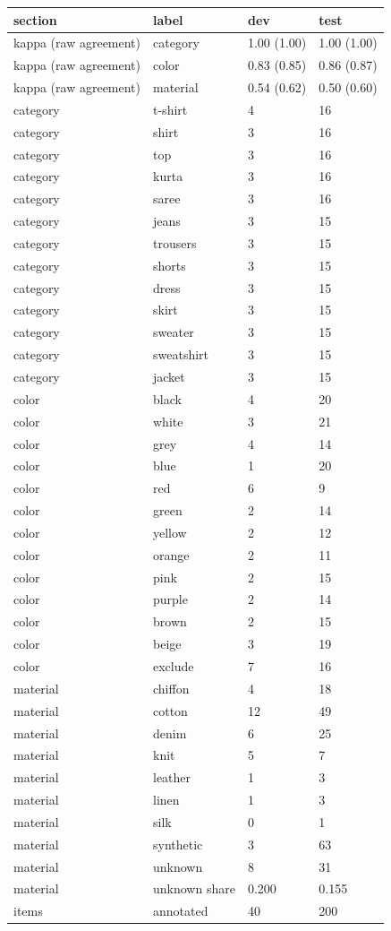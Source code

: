 \begin{tabular}{llll}
\toprule
section & label & dev & test \\
\midrule
kappa (raw agreement) & category & 1.00 (1.00) & 1.00 (1.00) \\
kappa (raw agreement) & color & 0.83 (0.85) & 0.86 (0.87) \\
kappa (raw agreement) & material & 0.54 (0.62) & 0.50 (0.60) \\
category & t-shirt & 4 & 16 \\
category & shirt & 3 & 16 \\
category & top & 3 & 16 \\
category & kurta & 3 & 16 \\
category & saree & 3 & 16 \\
category & jeans & 3 & 15 \\
category & trousers & 3 & 15 \\
category & shorts & 3 & 15 \\
category & dress & 3 & 15 \\
category & skirt & 3 & 15 \\
category & sweater & 3 & 15 \\
category & sweatshirt & 3 & 15 \\
category & jacket & 3 & 15 \\
color & black & 4 & 20 \\
color & white & 3 & 21 \\
color & grey & 4 & 14 \\
color & blue & 1 & 20 \\
color & red & 6 & 9 \\
color & green & 2 & 14 \\
color & yellow & 2 & 12 \\
color & orange & 2 & 11 \\
color & pink & 2 & 15 \\
color & purple & 2 & 14 \\
color & brown & 2 & 15 \\
color & beige & 3 & 19 \\
color & exclude & 7 & 16 \\
material & chiffon & 4 & 18 \\
material & cotton & 12 & 49 \\
material & denim & 6 & 25 \\
material & knit & 5 & 7 \\
material & leather & 1 & 3 \\
material & linen & 1 & 3 \\
material & silk & 0 & 1 \\
material & synthetic & 3 & 63 \\
material & unknown & 8 & 31 \\
material & unknown share & 0.200 & 0.155 \\
items & annotated & 40 & 200 \\
\bottomrule
\end{tabular}

